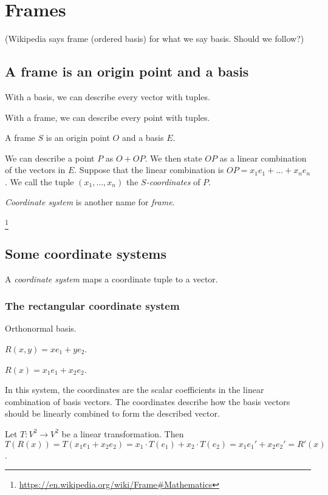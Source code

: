 \chapter{Frames}

(Wikipedia says frame (ordered basis) for what we say basis. Should we follow?)

\section{A frame is an origin point and a basis}

With a basis, we can describe every vector with tuples.

With a frame, we can describe every point with tuples.

A frame \(S\) is an origin point \( O \) and a basis \( E \).

We can describe a point \( P \) as \( O + OP \).
We then state \(OP\) as a linear combination of the vectors in \(E\).
Suppose that the linear combination is \(OP = x_1 e_1 + \ldots + x_n e_n\).
We call the tuple \( (x_1,\ldots,x_n) \) the \emph{\(S\)-coordinates} of \(P\).

\emph{Coordinate system} is another name for \emph{frame}.

\footnote{\url{https://en.wikipedia.org/wiki/Frame\#Mathematics}}

\section{Some coordinate systems}

A \emph{coordinate system} maps a coordinate tuple to a vector.

\subsection{The rectangular coordinate system}

Orthonormal basis.

\(R(x,y) = x e_1 + y e_2\).

\(R(x) = x_1 e_1 + x_2 e_2\).

In this system, the coordinates are the scalar coefficients in the linear combination of basis vectors.
The coordinates describe how the basis vectors should be linearly combined to form the described vector.

Let \(T : V^2 \to V^2\) be a linear transformation.
Then \(T(R(x)) = T(x_1 e_1 + x_2 e_2) = x_1 \cdot T(e_1) + x_2 \cdot T(e_2) = x_1 e_1' + x_2 e_2' = R'(x) \).

